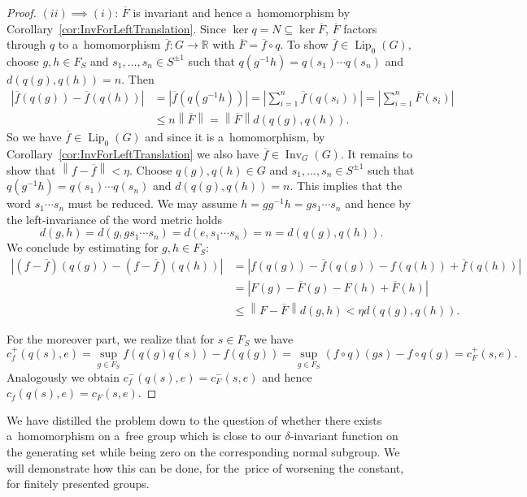 \documentclass[11pt,a4paper]{amsart}
\theoremstyle{definition}
\newcommand{\R}{\mathbb{R}}
\newcommand{\fBar}{\overline{f}}
\newcommand{\FBar}{\overline{F}}
\newcommand{\abs}[1]{\left| #1 \right|}
\newcommand{\norm}[1]{\left\| #1 \right\|}
\newcommand{\Lipz}{\operatorname{Lip}_0}
\newcommand{\inv}{\operatorname{Inv}}
\begin{document}
\begin{proof}
		$(ii) \implies (i)$: $\FBar$ is invariant and hence a~homomorphism by Corollary~\ref{cor:InvForLeftTranslation}. Since $\ker q = N \subseteq \ker \FBar$, $\FBar$ factors through $q$ to a~homomorphism $\fBar: G \to \R$ with $\FBar = \fBar \circ q$. To show $\fBar \in \Lipz(G)$, choose $g, h \in F_S$ and $s_1, \dots, s_n \in S^{\pm 1}$ such that $q(g^{-1}h) = q(s_1) \cdots q(s_n)$ and $d(q(g), q(h)) = n$. Then
		\begin{align*}
			\abs{\fBar(q(g)) - \fBar(q(h))}
			&= \abs{\fBar(q(g^{-1}h))}
			= \abs{\sum_{i=1}^n \fBar(q(s_i))}
			= \abs{\sum_{i=1}^n \FBar(s_i)}\\
			&\leq n \norm{\FBar}
			= \norm{\FBar} d(q(g), q(h)).
		\end{align*}
		So we have $\fBar \in \Lipz(G)$ and since it is a~homomorphism, by Corollary~\ref{cor:InvForLeftTranslation} we also have $\fBar \in \inv_G(G)$. It remains to show that $\norm{f - \fBar} < \eta$. Choose $q(g), q(h) \in G$ and $s_1, \dots, s_n \in S^{\pm 1}$ such that $q(g^{-1}h) = q(s_1) \cdots q(s_n)$ and $d(q(g), q(h)) = n$. This implies that the word $s_1 \cdots s_n$ must be reduced. We may assume $h = gg^{-1}h = gs_1 \cdots s_n$ and hence by the left-invariance of the word metric holds
		\begin{equation*}
			d(g, h)
			= d(g, g s_1 \cdots s_n)
			= d(e, s_1 \cdots s_n)
			= n
			= d(q(g), q(h)).
		\end{equation*}
		We conclude by estimating for $g, h \in F_S$:
		\begin{align*}
			\abs{(f-\fBar)(q(g)) - (f-\fBar)(q(h))}
			&=\abs{f(q(g)) - \fBar(q(g)) - f(q(h)) + \fBar(q(h))}\\
			&= \abs{F(g) - \FBar(g) - F(h) + \FBar(h)}\\
			&\leq \norm{F - \FBar} d(g, h)
			< \eta d(q(g), q(h)).
		\end{align*}
		
		For the moreover part, we realize that for $s \in F_S$ we have
		\begin{equation*}
			c_f^+(q(s), e)
			= \sup_{g \in F_S} f(q(g)q(s)) - f(q(g))
			= \sup_{g \in F_S} (f \circ q)(gs) - f\circ q (g)
			= c_F^+(s, e).
		\end{equation*}
		Analogously we obtain $c_f^-(q(s), e) = c_F^-(s, e)$ and hence $c_f(q(s),e) = c_F(s, e)$.
	\end{proof}
	
	We have distilled the problem down to the question of whether there exists a~homomorphism on a~free group which is close to our $\delta$-invariant function on the generating set while being zero on the corresponding normal subgroup. We will demonstrate how this can be done, for the~price of worsening the constant, for finitely presented groups.
	
\end{document}
